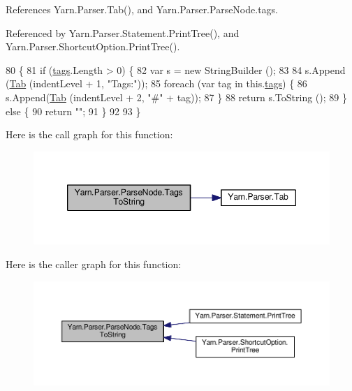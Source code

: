References Yarn.\-Parser.\-Tab(), and Yarn.\-Parser.\-Parse\-Node.\-tags.



Referenced by Yarn.\-Parser.\-Statement.\-Print\-Tree(), and Yarn.\-Parser.\-Shortcut\-Option.\-Print\-Tree().


\begin{DoxyCode}
80             \{
81                 \textcolor{keywordflow}{if} (\hyperlink{a00148_a58b3a15788fd2d4127d73619dc6d04ae}{tags}.Length > 0) \{
82                     var s = \textcolor{keyword}{new} StringBuilder ();
83 
84                     s.Append (\hyperlink{a00149_aa8fa36b46de12a1c561d77b99c4b9ae3}{Tab} (indentLevel + 1, \textcolor{stringliteral}{"Tags:"}));
85                     \textcolor{keywordflow}{foreach} (var tag \textcolor{keywordflow}{in} this.\hyperlink{a00148_a58b3a15788fd2d4127d73619dc6d04ae}{tags}) \{
86                         s.Append(\hyperlink{a00149_aa8fa36b46de12a1c561d77b99c4b9ae3}{Tab} (indentLevel + 2, \textcolor{stringliteral}{"#"} + tag));
87                     \}
88                     \textcolor{keywordflow}{return} s.ToString ();
89                 \} \textcolor{keywordflow}{else} \{
90                     \textcolor{keywordflow}{return} \textcolor{stringliteral}{""};
91                 \}
92 
93             \}
\end{DoxyCode}


Here is the call graph for this function\-:
\nopagebreak
\begin{figure}[H]
\begin{center}
\leavevmode
\includegraphics[width=350pt]{a00148_a054f36c80d5eeacd569a8859f599af67_cgraph}
\end{center}
\end{figure}




Here is the caller graph for this function\-:
\nopagebreak
\begin{figure}[H]
\begin{center}
\leavevmode
\includegraphics[width=350pt]{a00148_a054f36c80d5eeacd569a8859f599af67_icgraph}
\end{center}
\end{figure}



